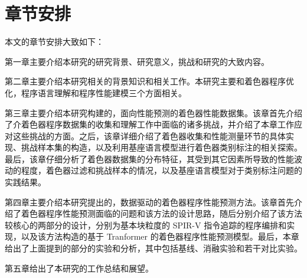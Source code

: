 \section{{\amend 章节安排}}

本文的章节安排大致如下：

第一章主要介绍本研究的研究背景、研究意义，挑战和研究的大致内容。

第二章主要介绍本研究相关的背景知识和相关工作。本研究主要和着色器程序优化，程序语言理解和程序性能建模三个方面相关。

{\added 第三章主要介绍本研究构建的，面向性能预测的着色器性能数据集。该章首先介绍了介着色器程序数据集的收集和理解工作中面临的诸多挑战，并介绍了本章工作应对这些挑战的方面。之后，该章详细介绍了着色器收集和性能测量环节的具体实现、挑战样本集的构造，以及利用基座语言模型进行着色器类别标注的相关探索。最后，该章仔细分析了着色器数据集的分布特征，其受到其它因素所导致的性能波动的程度，着色器过滤和挑战样本的情况，以及基座语言模型对于类别标注问题的实践结果。}

第四章主要介绍本研究提出的，数据驱动的着色器程序性能预测方法。该章首先介绍了着色器程序性能预测面临的问题和该方法的设计思路，随后分别介绍了该方法较核心的两部分的设计，分别为基本块粒度的 SPIR-V 指令追踪的程序编排和实现，以及该方法构造的{\amend 基于 Tranformer 的着色器程序性能预测模型}。最后，本章给出了上面提到的部分的实验和分析{\amend，其中包括基线、消融实验和若干对比实验。}

第五章给出了本研究的工作总结和展望。